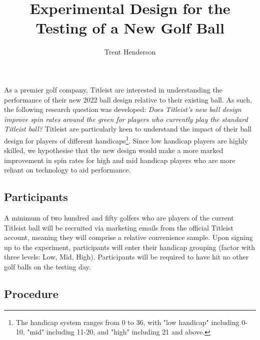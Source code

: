 \documentclass{article}
\begin{document}
\title{\vspace{-4cm}Experimental Design for the Testing of a New Golf Ball}
\author{Trent Henderson}
\date{}

\maketitle

As a premier golf company, Titleist are interested in understanding the performance of their new 2022 ball design relative to their existing ball. 
As such, the following research question was developed: \textit{Does Titleist's new ball design improve spin rates around the green for players who currently play the standard Titleist ball?} 
Titleist are particularly keen to understand the impact of their ball design for players of different handicaps\footnote{The handicap system ranges from 0 to 36, with "low handicap" including 0-10, "mid" including 11-20, and "high" including 21 and above.}. 
Since low handicap players are highly skilled, we hypothesise that the new design would make a more marked improvement in spin rates for high and mid handicap players who are more reliant on technology to aid performance.

\subsection*{Participants}

A minimum of two hundred and fifty golfers who are players of the current Titleist ball will be recruited via marketing emails from the official Titleist account, meaning they will comprise a relative convenience sample. 
Upon signing up to the experiment, participants will enter their handicap grouping (factor with three levels: Low, Mid, High).
Participants will be required to have hit no other golf balls on the testing day.

\subsection*{Procedure}
\end{document}
